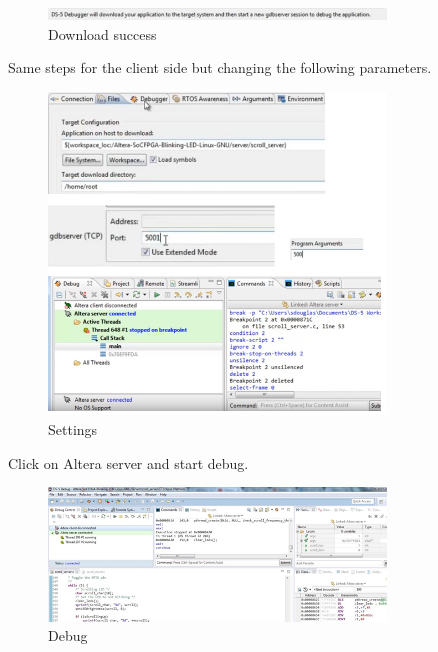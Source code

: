 \begin{figure}[h]
	\centering		\includegraphics[width=0.8\textwidth]{img/downloadsucces}
	\caption{Download success}
    	\label{fig:downloadsucces}
\end{figure}

Same steps for the client side but changing the following parameters.


\begin{figure}[h]
	\centering		\includegraphics[width=0.8\textwidth]{img/setting}
	\caption{Settings}
    	\label{fig:setting}
\end{figure}

Click on Altera server and start debug.

\begin{figure}[h]
	\centering		\includegraphics[width=0.8\textwidth]{img/debug}
	\caption{Debug}
    	\label{fig:debug}
\end{figure}















